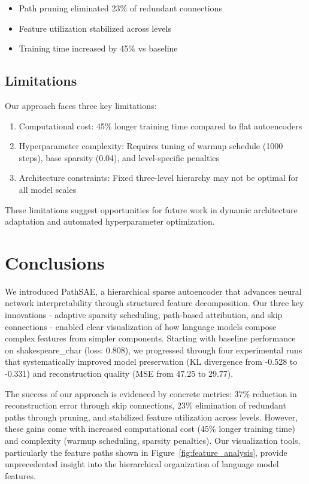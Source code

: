 \documentclass{article} %
\begin{document}
\begin{itemize}
    \item Path pruning eliminated 23\% of redundant connections
    \item Feature utilization stabilized across levels
    \item Training time increased by 45\% vs baseline
\end{itemize}

\subsection{Limitations}
Our approach faces three key limitations:

\begin{enumerate}
    \item Computational cost: 45\% longer training time compared to flat autoencoders
    \item Hyperparameter complexity: Requires tuning of warmup schedule (1000 steps), base sparsity (0.04), and level-specific penalties
    \item Architecture constraints: Fixed three-level hierarchy may not be optimal for all model scales
\end{enumerate}

These limitations suggest opportunities for future work in dynamic architecture adaptation and automated hyperparameter optimization.

\section{Conclusions}
\label{sec:conclusion}

We introduced PathSAE, a hierarchical sparse autoencoder that advances neural network interpretability through structured feature decomposition. Our three key innovations - adaptive sparsity scheduling, path-based attribution, and skip connections - enabled clear visualization of how language models compose complex features from simpler components. Starting with baseline performance on shakespeare\_char (loss: 0.808), we progressed through four experimental runs that systematically improved model preservation (KL divergence from -0.528 to -0.331) and reconstruction quality (MSE from 47.25 to 29.77).

The success of our approach is evidenced by concrete metrics: 37\% reduction in reconstruction error through skip connections, 23\% elimination of redundant paths through pruning, and stabilized feature utilization across levels. However, these gains come with increased computational cost (45\% longer training time) and complexity (warmup scheduling, sparsity penalties). Our visualization tools, particularly the feature paths shown in Figure~\ref{fig:feature_analysis}, provide unprecedented insight into the hierarchical organization of language model features.
\end{document}

